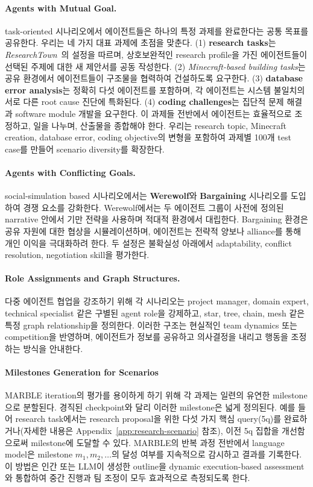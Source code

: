 \paragraph{Agents with Mutual Goal.}
task-oriented 시나리오에서 에이전트들은 하나의 특정 과제를 완료한다는 공통 목표를 공유한다. 우리는 네 가지 대표 과제에 초점을 맞춘다. (1) \textbf{research tasks}는 \textit{ResearchTown}~\cite{yu2024researchtownsimulatorhumanresearch}의 설정을 따르며, 상호보완적인 research profile을 가진 에이전트들이 선택된 주제에 대한 새 제안서를 공동 작성한다. (2) \textit{Minecraft-based building tasks}는 공유 환경에서 에이전트들이 구조물을 협력하여 건설하도록 요구한다. (3) \textbf{database error analysis}는 정확히 다섯 에이전트를 포함하며, 각 에이전트는 시스템 불일치의 서로 다른 root cause 진단에 특화된다. (4) \textbf{coding challenges}는 집단적 문제 해결과 software module 개발을 요구한다. 이 과제들 전반에서 에이전트는 효율적으로 조정하고, 일을 나누며, 산출물을 종합해야 한다. 우리는 research topic, Minecraft creation, database error, coding objective의 변형을 포함하여 과제별 100개 test case를 만들어 scenario diversity를 확장한다.

\paragraph{Agents with Conflicting Goals.}
social-simulation based 시나리오에서는 \textbf{Werewolf}와 \textbf{Bargaining} 시나리오를 도입하여 경쟁 요소를 강화한다. Werewolf에서는 두 에이전트 그룹이 사전에 정의된 narrative 안에서 기만 전략을 사용하며 적대적 환경에서 대립한다. Bargaining 환경은 공유 자원에 대한 협상을 시뮬레이션하며, 에이전트는 전략적 양보나 alliance를 통해 개인 이익을 극대화하려 한다. 두 설정은 불확실성 아래에서 adaptability, conflict resolution, negotiation skill을 평가한다.

\paragraph{Role Assignments and Graph Structures.}
다중 에이전트 협업을 강조하기 위해 각 시나리오는 project manager, domain expert, technical specialist 같은 구별된 agent role을 강제하고, star, tree, chain, mesh 같은 특정 graph relationship을 정의한다. 이러한 구조는 현실적인 team dynamics 또는 competition을 반영하며, 에이전트가 정보를 공유하고 의사결정을 내리고 행동을 조정하는 방식을 안내한다.

\paragraph{Milestones Generation for Scenarios}
\label{para:milestones}
MARBLE iteration의 평가를 용이하게 하기 위해 각 과제는 일련의 유연한 milestone으로 분할된다. 경직된 checkpoint와 달리 이러한 milestone은 넓게 정의된다. 예를 들어 research task에서는 research proposal을 위한 다섯 가지 핵심 query(5q)를 완료하거나(자세한 내용은 Appendix~\ref{app:research-scenario} 참조), 이전 5q 집합을 개선함으로써 milestone에 도달할 수 있다. MARBLE의 반복 과정 전반에서 language model은 milestone \(m_1, m_2, \dots\)의 달성 여부를 지속적으로 감시하고 결과를 기록한다. 이 방법은 인간 또는 LLM이 생성한 outline을 dynamic execution-based assessment와 통합하여 중간 진행과 팀 조정이 모두 효과적으로 측정되도록 한다.

